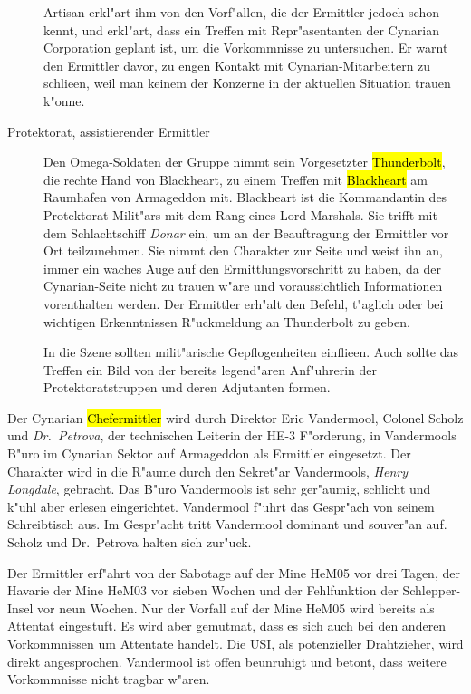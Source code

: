 \begin{description}
		Artisan erkl"art ihm von den Vorf"allen, die der Ermittler jedoch schon kennt, und erkl"art, dass ein Treffen mit Repr"asentanten der Cynarian Corporation geplant ist, um die Vorkommnisse zu untersuchen. Er warnt den Ermittler davor, zu engen Kontakt mit Cynarian-Mitarbeitern zu schlie\3en, weil man keinem der Konzerne in der aktuellen Situation trauen k"onne. 
	\item [Protektorat, assistierender Ermittler] Den Omega-Soldaten der Gruppe nimmt sein Vorgesetzter \hl{Thunderbolt}, die rechte Hand 
		von Blackheart, zu einem Treffen mit \hl{Blackheart} am Raumhafen von Armageddon mit. Blackheart ist die Kommandantin des Protektorat-Milit"ars mit dem Rang eines Lord Marshals. Sie trifft mit dem Schlachtschiff \emph{Donar} ein, um an der Beauftragung der Ermittler vor Ort teilzunehmen. Sie nimmt den Charakter zur Seite und weist ihn an, immer ein waches Auge auf den Ermittlungsvorschritt zu haben, da der Cynarian-Seite nicht zu trauen w"are und voraussichtlich Informationen vorenthalten werden. Der Ermittler erh"alt den Befehl, t"aglich oder bei wichtigen Erkenntnissen R"uckmeldung an Thunderbolt zu geben. 
		
		In die Szene sollten milit"arische Gepflogenheiten einflie\3en. Auch sollte das Treffen ein Bild von der bereits legend"aren Anf"uhrerin der Protektoratstruppen und deren Adjutanten formen. 
\end{description}


Der Cynarian \hl{Chefermittler} wird durch Direktor Eric Vandermool, Colonel Scholz und \emph{Dr.~Petrova}, der technischen Leiterin der HE-3 F"orderung, in Vandermools B"uro im Cynarian Sektor auf Armageddon als Ermittler eingesetzt. Der Charakter wird in die R"aume durch den Sekret"ar Vandermools, \emph{Henry Longdale}, gebracht. Das B"uro Vandermools ist sehr ger"aumig, schlicht und k"uhl aber erlesen eingerichtet. Vandermool f"uhrt das Gespr"ach von seinem Schreibtisch aus. Im Gespr"acht tritt Vandermool dominant und souver"an auf. Scholz und Dr.~Petrova halten sich zur"uck.

Der Ermittler erf"ahrt von der Sabotage auf der Mine HeM05 vor drei Tagen, der Havarie der Mine HeM03 vor sieben Wochen und der Fehlfunktion der Schlepper-Insel vor neun Wochen. Nur der Vorfall auf der Mine HeM05 wird bereits als Attentat eingestuft. Es wird aber gemutma\3t, dass es sich auch bei den anderen Vorkommnissen um Attentate handelt. Die USI, als potenzieller Drahtzieher, wird direkt angesprochen. Vandermool ist offen beunruhigt und betont, dass weitere Vorkommnisse nicht tragbar w"aren.

